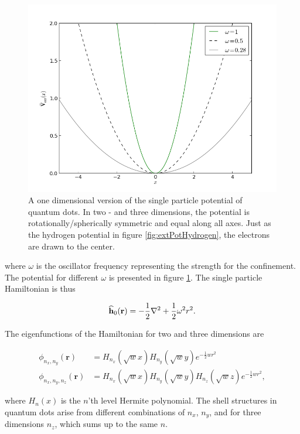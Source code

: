 \begin{figure}
 \begin{center}
  \includegraphics[scale=0.5]{../Graphics/Potentials/qdots.png}
  \caption{A one dimensional version of the single particle potential of quantum dots. In two - and three dimensions, the potential is rotationally/spherically symmetric and equal along all axes. Just as the hydrogen potential in figure \ref{fig:extPotHydrogen}, the electrons are drawn to the center.}
  \label{fig:extPotQDOTS}
 \end{center}
\end{figure}

where $\omega$ is the oscillator frequency representing the strength for the confinement. The potential for different $\omega$ is presented in figure \ref{fig:extPotQDOTS}. The single particle Hamiltonian is thus

\begin{equation}
 {\bf\widehat{h}}_0(\mathbf{r}) = -\frac{1}{2}\nabla^2 + \frac{1}{2}\omega^2r^2.
\end{equation}

The eigenfunctions of the Hamiltonian for two and three dimensions are \cite{Sakurai:94}

\begin{align}
\phi_{n_x, n_y}(\mathbf{r}) &= H_{n_x}(\sqrt{w}x)H_{n_y}(\sqrt{w}y)e^{-\frac{1}{2}wr^2} \\
\phi_{n_x, n_y, n_z}(\mathbf{r}) &= H_{n_x}(\sqrt{w}x)H_{n_y}(\sqrt{w}y)H_{n_z}(\sqrt{w}z)e^{-\frac{1}{2}wr^2},
\end{align}

where $H_n(x)$ is the $n$'th level Hermite polynomial. The shell structures in quantum dots arise from different combinations of $n_x$, $n_y$, and for three dimensions $n_z$, which sums up to the same $n$.


